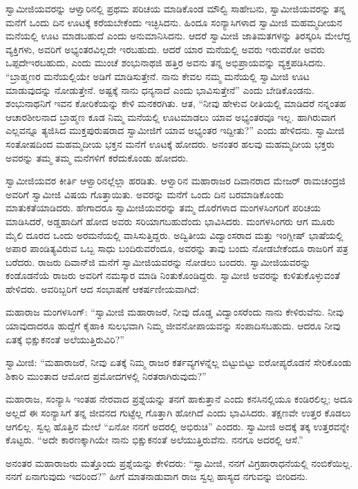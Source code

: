  ಸ್ವಾಮೀಜಿಯವರನ್ನು ಆಳ್ವಾರಿನಲ್ಲಿ ಪ್ರಥಮ ಪರಿಚಯ ಮಾಡಿಕೊಂಡ ಮೌಲ್ವಿ ಸಾಹೇಬನು, ಸ್ವಾಮೀಜಿಯವರನ್ನು ತನ್ನ ಮನೆಗೆ ಒಂದು ದಿನ ಊಟಕ್ಕೆ ಕರೆಯಬೇಕೆಂದು ಇಚ್ಛಿಸಿದನು. ಹಿಂದೂ ಸಂನ್ಯಾಸಿಗಳಾದ ಸ್ವಾಮೀಜಿ ಮಹಮ್ಮದೀಯನ ಮನೆಯಲ್ಲಿ ಊಟ ಮಾಡಬಹುದೆ ಎಂದು ಅನುಮಾನಿಸಿದನು. ಆದರೆ ಸ್ವಾಮೀಜಿ ಜಾತಿಮತಗಳನ್ನು ತಿರಸ್ಕರಿಸಿ ಮೇಲೆದ್ದ ವ್ಯಕ್ತಿಗಳು, ಅವರಿಗೆ ಅಭ್ಯಂತರವಿಲ್ಲದೇ ಇರಬಹುದು. ಆದರೆ ಯಾರ ಮನೆಯಲ್ಲಿ ಅವರು ಇರುವರೋ ಅವರು ಒಪ್ಪದೇ\break ಇರಬಹುದು, ಎಂದು ಮುಂಚೆ ಶಂಭುನಾಥಜಿ ಹತ್ತಿರ ಅವನು ತನ್ನ ಅಭಿಪ್ರಾಯವನ್ನು ವ್ಯಕ್ತಪಡಿಸಿದನು. “ಬ್ರಾಹ್ಮಣರ ಮನೆಯಲ್ಲಿಯೇ ಅಡಿಗೆ ಮಾಡಿಸುತ್ತೇನೆ. ನಾನು ಕೇವಲ ನಮ್ಮ ಮನೆಯಲ್ಲಿ ಸ್ವಾಮೀಜಿ ಊಟ ಮಾಡುವುದನ್ನು ನೋಡುತ್ತೇನೆ. ಅಷ್ಟಕ್ಕೆ ನಾನು ಧನ್ಯನಾದೆ ಎಂದು ಭಾವಿಸುತ್ತೇನೆ” ಎಂದು ಬೇಡಿಕೊಂಡನು. ಶಂಭುನಾಥನಿಗೆ ಇವನ ಕೋರಿಕೆಯನ್ನು ಕೇಳಿ ಮನಕರಗಿತು. ಆತ, “ನೀವು ಹೇಳುವ ರೀತಿಯಲ್ಲಿ ಮಾಡಿದರೆ ನನ್ನಂತಹ ಆಚಾರಶೀಲನಾದ ಬ್ರಾಹ್ಮಣ ಕೂಡ ನಿಮ್ಮ ಮನೆಯಲ್ಲಿ ಊಟಮಾಡಲು ಯಾವ ಅಭ್ಯಂತರವೂ ಇಲ್ಲ. ಹಾಗಿರುವಾಗ ಎಲ್ಲವನ್ನೂ ತ್ಯಜಿಸಿದ ಮುಕ್ತಪುರುಷರಾದ ಸ್ವಾಮೀಜಿಗೆ ಯಾವ ಅಭ್ಯಂತರ ಇದ್ದೀತು?” ಎಂದು ಹೇಳಿದನು. ಸ್ವಾಮೀಜಿ ಸಂತೋಷದಿಂದ ಮಹಮ್ಮದೀಯ ಭಕ್ತನ ಮನೆಗೆ ಊಟಕ್ಕೆ ಹೋದರು. ಅನಂತರ ಹಲವು ಮಹಮ್ಮದೀಯ ಭಕ್ತರು ಅವರನ್ನು ತಮ್ಮ ತಮ್ಮ ಮನೆಗಳಿಗೆ ಕರೆದುಕೊಂಡು ಹೋದರು. 

 ಸ್ವಾಮೀಜಿಯವರ ಕೀರ್ತಿ ಆಳ್ವಾರಿನಲ್ಲೆಲ್ಲಾ ಹರಡಿತು. ಆಳ್ವಾರಿನ ಮಹಾರಾಜರ ದಿವಾನರಾದ ಮೇಜರ್ ರಾಮಚಂದ್ರಜಿ ಅವರಿಗೆ ಸ್ವಾಮೀಜಿ ವಿಷಯ ಗೊತ್ತಾಯಿತು. ಅವರನ್ನು ಮನೆಗೆ ಒಂದು ದಿನ ಬರಮಾಡಿಕೊಂಡು ಮಾತುಕತೆಯಾಡಿದರು. ಹೇಗಾದರೂ ಸ್ವಾಮೀಜಿಯವರನ್ನು ತಮ್ಮ ದೊರೆಗಳಾದ ಮಂಗಳಸಿಂಗರಿಗೆ ಪರಿಚಯ ಮಾಡಿಸಿದರೆ, ಅಡ್ಡಹಾದಿಗೆ ಹೋದ ಅವರು ಸರಿಯಾಗಬಹುದೆಂದು ಭಾವಿಸಿದರು. ಮಂಗಳಸಿಂಗರು ಆಗ ಮೂರು ಮೈಲಿ ದೂರದ ಒಂದು ಅರಮನೆಯಲ್ಲಿ ವಾಸಿಸುತ್ತಿದ್ದರು. ಅದ್ವಿತೀಯ ವಿದ್ವಾಂಸರಾದ ಮತ್ತು ಇಂಗ್ಲೀಷ್ ಭಾಷೆಯಲ್ಲಿ ಅಪಾರ ಪಾಂಡಿತ್ಯವಿರುವ ಒಬ್ಬ ಸಾಧು ಬಂದಿರುವರೆಂದೂ, ಅವರನ್ನು ತಾವು ಬಂದು ನೋಡಬೇಕೆಂದೂ ರಾಜರಿಗೆ ಪತ್ರ ಬರೆದರು. ರಾಜರು ದಿವಾನ್‍ಜಿ ಮನೆಗೆ ಸ್ವಾಮೀಜಿಯವರನ್ನು ನೋಡಲು ಬಂದರು. ಸ್ವಾಮೀಜಿಯವರನ್ನು ಕಂಡೊಡನೆಯೆ ರಾಜರು ಅವರಿಗೆ ನಮಸ್ಕಾರ ಮಾಡಿ ನಿಂತುಕೊಂಡಿದ್ದರು. ಸ್ವಾಮೀಜಿ ಅವರನ್ನು ಕುಳಿತುಕೊಳ್ಳುವಂತೆ ಹೇಳಿದರು. ಅವರಿಬ್ಬರಿಗೆ ಆದ ಸಂಭಾಷಣೆ ಆಕರ್ಷಣೀಯವಾಗಿದೆ: 

 ಮಹಾರಾಜ ಮಂಗಳಸಿಂಗ್: “ಸ್ವಾಮೀಜಿ ಮಹಾರಾಜರೆ, ನೀವು ದೊಡ್ಡ ವಿದ್ವಾಂಸರೆಂದು ನಾನು ಕೇಳಿರುವೆನು. ನೀವು ಯಾವುದಾದರೂ ಹುದ್ದೆಗೆ ಕೈಹಾಕಿ ಸುಲಭವಾಗಿ ನಿಮ್ಮ ಜೀವನೋಪಾಯವನ್ನು ಸಂಪಾದಿಸಬಹುದು. ಆದರೂ ನೀವು ಏತಕ್ಕೆ ಭಿಕ್ಷುಕನಂತೆ ಅಲೆಯುತ್ತಿರುವಿರಿ?” 

 ಸ್ವಾಮೀಜಿ: “ಮಹಾರಾಜರೆ, ನೀವು ಏತಕ್ಕೆ ನಿಮ್ಮ ರಾಜರ ಕರ್ತವ್ಯಗಳನ್ನೆಲ್ಲ ಬಿಟ್ಟುಬಿಟ್ಟು ಐರೋಪ್ಯರೊಡನೆ ಸೇರಿಕೊಂಡು ಶಿಕಾರಿ ಮುಂತಾದ ಆಮೋದ ಪ್ರಮೋದಗಳಲ್ಲಿ ನಿರತರಾಗಿರುವುದು?” 

 ಮಹಾರಾಜ, ಸಂನ್ಯಾಸಿ ಇಂತಹ ನೇರವಾದ ಪ್ರಶ್ನೆಯನ್ನು ತನಗೆ ಹಾಕುತ್ತಾನೆ ಎಂದು ಕನಸಿನಲ್ಲಿಯೂ ಕಂಡಿರಲಿಲ್ಲ; ಅದೂ ಅಲ್ಲದೆ ಈ ಸಂನ್ಯಾಸಿಗೆ ತನ್ನ ಜೀವನದ ಗುಟ್ಟೆಲ್ಲ ಗೊತ್ತಾಗಿ ಹೋಗಿದೆ ಎಂದು ಭಾವಿಸಿದರು. ತಕ್ಷಣವೇ ಉತ್ತರ ಕೊಡಲು ಆಗಲಿಲ್ಲ. ಸ್ವಲ್ಪ ಹೊತ್ತಿನ ಮೇಲೆ “ಏನೋ ನನಗೆ ಅದರಲ್ಲಿ ಅಭಿರುಚಿ” ಎಂದರು. ಸ್ವಾಮೀಜಿ ಅದಕ್ಕೆ ತಕ್ಕ ಉತ್ತರವನ್ನೇ ಕೊಟ್ಟರು. “ಅದೇ ಕಾರಣಕ್ಕಾಗಿಯೇ ನಾನು ಭಿಕ್ಷುಕನಂತೆ ಅಲೆಯುತ್ತಿರುವೆನು. ನನಗೂ ಅದರಲ್ಲಿ ಆಸೆ.” 

 ಅನಂತರ ಮಹಾರಾಜರು ಮತ್ತೊಂದು ಪ್ರಶ್ನೆಯನ್ನು ಕೇಳಿದರು: “ಸ್ವಾಮೀಜಿ, ನನಗೆ ವಿಗ್ರಹಾರಾಧನೆಯಲ್ಲಿ ನಂಬಿಕೆಯಿಲ್ಲ. ನನಗೆ ಏನಾಗುವುದು ಇದರಿಂದ?” ಹೀಗೆ ಮಾತನಾಡುವಾಗ ರಾಜ ಸ್ವಲ್ಪ ಹಾಸ್ಯದ ನಗುವನ್ನು ಬೀರಿದನು. 

